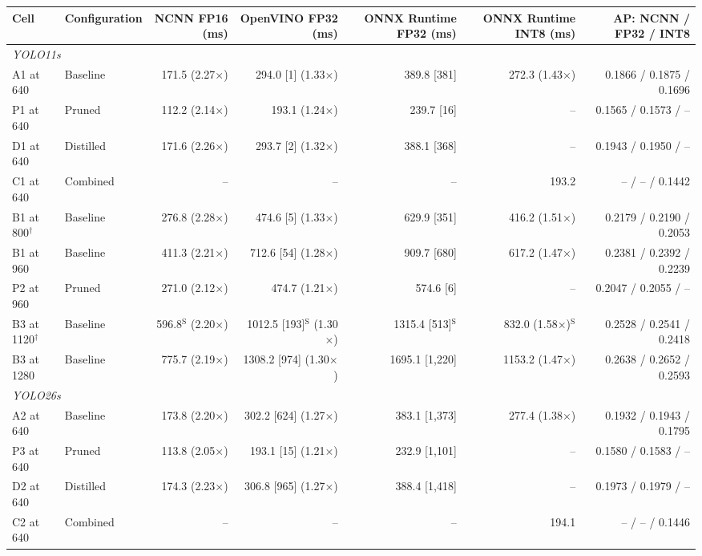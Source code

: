 \begin{tabular}{llrrrrr}
\toprule
Cell & Configuration & NCNN FP16 (ms) & OpenVINO FP32 (ms) & ONNX Runtime FP32 (ms) & ONNX Runtime INT8 (ms) & AP: NCNN / FP32 / INT8 \\
\midrule
\multicolumn{7}{l}{\textit{YOLO11s}} \\
A1 at 640 & Baseline & 171.5 (2.27$\times$) & 294.0 [1] (1.33$\times$) & 389.8 [381] & 272.3 (1.43$\times$) & 0.1866 / 0.1875 / 0.1696 \\
P1 at 640 & Pruned & 112.2 (2.14$\times$) & 193.1 (1.24$\times$) & 239.7 [16] & -- & 0.1565 / 0.1573 / -- \\
D1 at 640 & Distilled & 171.6 (2.26$\times$) & 293.7 [2] (1.32$\times$) & 388.1 [368] & -- & 0.1943 / 0.1950 / -- \\
C1 at 640 & Combined & -- & -- & -- & 193.2 & -- / -- / 0.1442 \\
B1 at 800$^{\dagger}$ & Baseline & 276.8 (2.28$\times$) & 474.6 [5] (1.33$\times$) & 629.9 [351] & 416.2 (1.51$\times$) & 0.2179 / 0.2190 / 0.2053 \\
B1 at 960 & Baseline & 411.3 (2.21$\times$) & 712.6 [54] (1.28$\times$) & 909.7 [680] & 617.2 (1.47$\times$) & 0.2381 / 0.2392 / 0.2239 \\
P2 at 960 & Pruned & 271.0 (2.12$\times$) & 474.7 (1.21$\times$) & 574.6 [6] & -- & 0.2047 / 0.2055 / -- \\
B3 at 1120$^{\dagger}$ & Baseline & 596.8$^{\mathrm{S}}$ (2.20$\times$) & 1012.5 [193]$^{\mathrm{S}}$ (1.30$\times$) & 1315.4 [513]$^{\mathrm{S}}$ & 832.0 (1.58$\times$)$^{\mathrm{S}}$ & 0.2528 / 0.2541 / 0.2418 \\
B3 at 1280 & Baseline & 775.7 (2.19$\times$) & 1308.2 [974] (1.30$\times$) & 1695.1 [1{,}220] & 1153.2 (1.47$\times$) & 0.2638 / 0.2652 / 0.2593 \\
\midrule
\multicolumn{7}{l}{\textit{YOLO26s}} \\
A2 at 640 & Baseline & 173.8 (2.20$\times$) & 302.2 [624] (1.27$\times$) & 383.1 [1{,}373] & 277.4 (1.38$\times$) & 0.1932 / 0.1943 / 0.1795 \\
P3 at 640 & Pruned & 113.8 (2.05$\times$) & 193.1 [15] (1.21$\times$) & 232.9 [1{,}101] & -- & 0.1580 / 0.1583 / -- \\
D2 at 640 & Distilled & 174.3 (2.23$\times$) & 306.8 [965] (1.27$\times$) & 388.4 [1{,}418] & -- & 0.1973 / 0.1979 / -- \\
C2 at 640 & Combined & -- & -- & -- & 194.1 & -- / -- / 0.1446 \\

\end{tabular}
